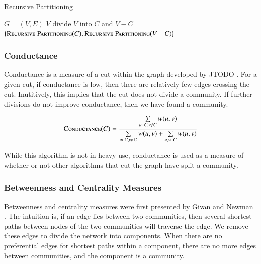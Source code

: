 \documentclass[phd,tocprelim]{cornell}
\renewcommand{\caption}[1]{\singlespacing\hangcaption{#1}\normalspacing}
\begin{document}
\begin{algorithm}                              %
\caption{{\sc Recursive Partitioning}}         %
\label{alg_top_down}                                   %
\begin{algorithmic}                        %
\REQUIRE $G=(V, E)$
\RETURN $V$
\ELSE
\STATE divide $V$ into $C$ and $V - C$
\RETURN $\{\mbox{\sc Recursive Partitioning}(C),\mbox{\sc Recursive Partitioning}(V-C)\}$
\ENDIF
\end{algorithmic}
\label{alg_rec_part}
\end{algorithm}

\subsubsection{Conductance}

Conductance is a measure of a cut within the graph developed by JTODO \cite{JTODO}.  For a given cut, if conductance is low, then there are relatively few edges crossing the cut.  Inutitively, this implies that the cut does not divide a community.  If further divisions do not improve conductance, then we have found a community.

\begin{equation}
\mbox{\sc Conductance}(C) = \frac{\sum\limits_{u \in C, v \notin C} w(u,v)}{\sum\limits_{u \in C, v \notin C} w(u,v)  + \sum\limits_{u,v \in C} w(u, v)}
\end{equation}

While this algorithm is not in heavy use, conductance is used as a measure of whether or not other algorithms that cut the graph have split a community.

\subsubsection{Betweenness and Centrality Measures}

Betweenness and centrality measures were first presented by Givan and Newman \cite{girvan}.  The intuition is, if an edge lies between two communities, then several shortest paths between nodes of the two communities will traverse the edge.  We remove these edges to divide the network into components.  When there are no preferential edges for shortest paths within a component, there are no more edges between communities, and the component is a community.
\end{document}
